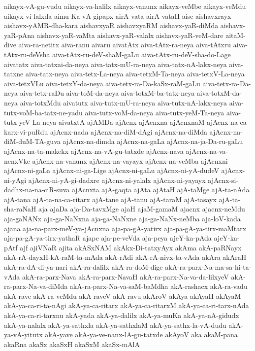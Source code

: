 {aikayx-vA-gu-vudu
aikayx-va-halilx
aikayx-vanunx
aikayx-veMbe
aikayx-veMdu
aikayx-vi-lalxda
aimu-Ka-vA-gipapx
airA-vata
airA-vataH
aise
aishavxrayx
aishavx-yAMR-dha-kara
aishavxyaR
aishavxyaRM
aishavx-yaR-diMda
aishavx-yaR-pAna
aishavx-yaR-vaMta
aishavx-yaR-valalx
aishavx-yaR-veM-dare
aitaM-dive
aiva-ra-netitx
aiva-ranu
aivaru
aivatAtx
aiva-tAtx-ra-neya
aiva-tAtxru
aiva-tAtx-ru-deVsha
aiva-tAtx-ru-deV-shaM-gaLu
aiva-tAtx-ru-deV-sha-do-Lage
aivatatx
aiva-tatxai-da-neya
aiva-tatx-mU-ra-neya
aiva-tatx-nA-lakx-neya
aiva-tatxne
aiva-tatx-neya
aiva-tetx-La-neya
aiva-tetxM-Ta-neya
aiva-tetxV-La-neya
aiva-tetxVLu
aiva-tetxY-da-neya
aiva-tetx-ra-Da-kaSx-raM-gaLu
aiva-tetx-ra-Da-neya
aiva-tetx-raDu
aiva-toM-da-neya
aiva-totxM-ba-tatx-neya
aiva-totxM-da-neya
aiva-totxMdu
aivatutx
aiva-tutx-mU-ra-neya
aiva-tutx-nA-lakx-neya
aiva-tutx-voM-ba-tatx-ne-yadu
aiva-tutx-voM-da-neya
aiva-tutx-yeM-Ta-neya
aiva-tutx-yeV-La-neya
aivatxtA
ajAMDa
ajAcnx
ajAcnxna
ajAcnxnaM
ajAcnx-na-ca-karx-vi-puRdu
ajAcnx-nada
ajAcnx-na-diM-dAgi
ajAcnx-na-diMda
ajAcnx-na-diM-duM-TA-guva
ajAcnx-na-dimda
ajAcnx-na-gaLa
ajAcnx-na-ja-Da-ru-gaLu
ajAcnx-na-ta-makekx
ajAcnx-na-vA-gu-tatxde
ajAcnx-nava
ajAcnx-na-va-nenxVke
ajAcnx-na-vanunx
ajAcnx-na-vayayx
ajAcnx-na-veMba
ajAcnxni
ajAcnx-ni-gaLa
ajAcnx-ni-ga-Lige
ajAcnx-ni-gaLu
ajAcnx-ni-yA-dudeV
ajAcnx-ni-yAgi
ajAcnx-ni-yA-gi-dadxre
ajAcnx-ni-yalalx
ajAcnx-ni-yayayx
ajAcnx-si-dadhx-na-na-ciR-suva
ajAcnxta
ajA-gaqta
ajAta
ajAtaH
ajA-taMge
ajA-ta-nAda
ajA-tana
ajA-ta-na-ca-ritarx
ajA-tane
ajA-tanu
ajA-taraM
ajA-tasayx
ajA-ta-sha-raNaH
aja
ajaDa
aja-Da-tavxMge
ajaH
ajaM-gamaM
ajacnx
ajacnx-neMdu
aja-gaNANx
aja-ga-NaNxna
aja-ga-NaNxne
aja-ga-NaNx-neMba
aja-loV-kada
ajana
aja-na-parx-meV-ya-jAcnxna
aja-pa-gA-yatirx
aja-pa-gA-ya-tirx-maMtarx
aja-pa-gA-ya-tirx-yathaR
ajape
aja-pe-veVda
aja-peya
ajeY-ka-pAda
ajeY-ka-pAtf
ajf
ajiVNaR
ajita
akASxNAM
akAkx-Di-tatxyAyx
akAma
akA-paRNayx
akA-rA-dayxH-kA-raM-ta-mAda
akA-rAdi
akA-rA-nivx-ta-vAda
akAra
akAraH
akA-ra-dA-di-ya-nari
akA-ra-dalilx
akA-ra-doM-dige
akA-ra-parx-Na-ma-sa-hi-ta-vAda
akA-ra-parx-Nava
akA-ra-parx-NavaH
akA-ra-parx-Na-va-da-lilxyeV
akA-ra-parx-Na-va-diMda
akA-ra-parx-Na-va-saM-baMdha
akA-rashacx
akA-ra-vadu
akA-rave
akA-ra-veMdu
akA-raveV
akA-ravu
akAroV
akAya
akAyaH
akAyaM
akA-ya-ca-ri-ta-nAgi
akA-ya-ca-ritarx
akA-ya-ca-ritarxM
akA-ya-ca-ri-tarx-nAda
akA-ya-ca-ri-tarxnu
akA-yada
akA-ya-dalilx
akA-ya-muKa
akA-ya-nA-gidudx
akA-ya-nalalx
akA-ya-sathxla
akA-ya-sathxlaM
akA-ya-sathx-la-vA-dudu
akA-ya-vA-yitutx
akA-yave
akA-ya-ve-nanx-lA-gu-tatxde
akAyoV
aka
akaM-pana
akaRna
akaSx
akaSxH
akaSxM
akaSx-mAlA
}
